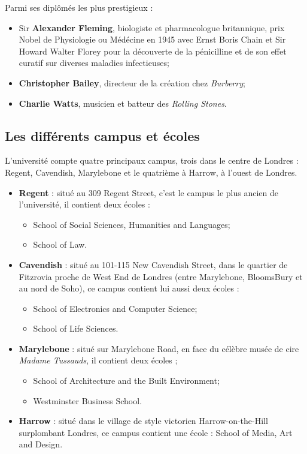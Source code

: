 \noindent Parmi ses dipl\^om\'es les plus prestigieux :
\begin{itemize}
	\item Sir \textbf{Alexander Fleming}, biologiste et pharmacologue britannique, prix Nobel de Physiologie ou M\'ed\'ecine en 1945 avec Ernst Boris Chain et Sir Howard Walter Florey pour la d\'ecouverte de la p\'enicilline et de son effet curatif sur diverses maladies infectieuses;
	\item \textbf{Christopher Bailey}, directeur de la cr\'eation chez \textit{Burberry};
	\item \textbf{Charlie Watts}, musicien et batteur des \textit{Rolling Stones}.

\end{itemize}

\subsection{Les diff\'erents campus et \'ecoles}

L'universit\'e compte quatre principaux campus, trois dans le centre de Londres : Regent, Cavendish, Marylebone et le quatri\`eme \`a Harrow, \`a l'ouest de Londres.

\begin{itemize}
	\item \textbf{Regent} : situ\'e au 309 Regent Street, c'est le campus le plus ancien de l'universit\'e, il contient deux \'ecoles : 
	\begin{itemize}
		\item School of Social Sciences, Humanities and Languages;
		\item School of Law.

	\end{itemize}

	\item \textbf{Cavendish} : situ\'e au 101-115 New Cavendish Street, dans le quartier de Fitzrovia proche de West End de Londres (entre Marylebone, BloomsBury et au nord de Soho), ce campus contient lui aussi deux \'ecoles :
	\begin{itemize}
		\item School of Electronics and Computer Science;
		\item School of Life Sciences.

	\end{itemize}

	\item \textbf{Marylebone} : situ\'e sur Marylebone Road, en face du c\'el\`ebre mus\'ee de cire \textit{Madame Tussauds}, il contient deux \'ecoles ;
	\begin{itemize}
		\item School of Architecture and the Built Environment;
		\item Westminster Business School.

	\end{itemize}

	\item \textbf{Harrow} : situ\'e dans le village de style victorien Harrow-on-the-Hill surplombant Londres, ce campus contient une \'ecole : School of Media, Art and Design.

\end{itemize}

